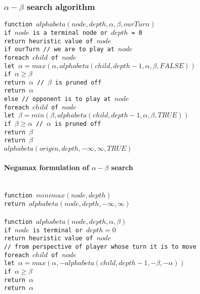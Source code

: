 \subsubsection{$\alpha-\beta$ search algorithm}
\texttt{function $alphabeta(node, depth, \alpha, \beta, ourTurn)$\\
\indent if $node$ is a terminal node or $depth$ = 0\\
\indent\indent return heuristic value of $node$\\
\indent if ourTurn // we are to play at $node$\\
\indent\indent foreach $child$ of $node$\\
\indent\indent\indent let $\alpha = max(\alpha, alphabeta(child, depth-1,
\alpha, \beta, FALSE))$\\
\indent\indent\indent if $\alpha \geq \beta$\\
\indent\indent\indent\indent return $\alpha$ // $\beta$ is pruned off\\
\indent\indent return $\alpha$\\
\indent else // opponent is to play at $node$\\
\indent\indent foreach $child$ of $node$\\
\indent\indent\indent let $\beta = min(\beta, alphabeta(child, depth-1, \alpha,
\beta, TRUE))$\\
\indent\indent\indent if $\beta \geq \alpha$ // $\alpha$ is pruned off\\
\indent\indent\indent\indent return $\beta$\\
\indent\indent return $\beta$\\
$alphabeta(origin, depth, -\infty, \infty, TRUE)$
}

\paragraph{Negamax formulation of $\alpha-\beta$ search\\}
\texttt{\\
function $minimax(node, depth)$\\
\indent return $alphabeta(node, depth, -\infty, \infty)$\\
\\
function $alphabeta(node, depth, \alpha, \beta)$\\
\indent if $node$ is terminal or $depth = 0$\\
\indent\indent return heuristic value of $node$\\
\indent\indent // from perspective of player whose turn it is to move\\
\indent foreach $child$ of $node$\\
\indent\indent let $\alpha = max(\alpha, -alphabeta(child, depth-1, -\beta,
-\alpha))$\\
\indent\indent if $\alpha \geq \beta$\\
\indent\indent\indent return $\alpha$\\
\indent return $\alpha$
}

